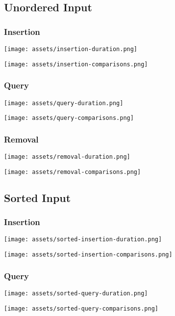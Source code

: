 \documentclass[12pt]{elsarticle}
\begin{document}
\subsection{Unordered Input}
\subsubsection{Insertion}
\begin{center}\texttt{[image: assets/insertion-duration.png]}\end{center}
\begin{center}\texttt{[image: assets/insertion-comparisons.png]}\end{center}
\subsubsection{Query}
\begin{center}\texttt{[image: assets/query-duration.png]}\end{center}
\begin{center}\texttt{[image: assets/query-comparisons.png]}\end{center}
\subsubsection{Removal}
\begin{center}\texttt{[image: assets/removal-duration.png]}\end{center}
\begin{center}\texttt{[image: assets/removal-comparisons.png]}\end{center}

\subsection{Sorted Input}
\subsubsection{Insertion}
\begin{center}\texttt{[image: assets/sorted-insertion-duration.png]}\end{center}
\begin{center}\texttt{[image: assets/sorted-insertion-comparisons.png]}\end{center}
\subsubsection{Query}
\begin{center}\texttt{[image: assets/sorted-query-duration.png]}\end{center}
\begin{center}\texttt{[image: assets/sorted-query-comparisons.png]}\end{center}
\end{document}
